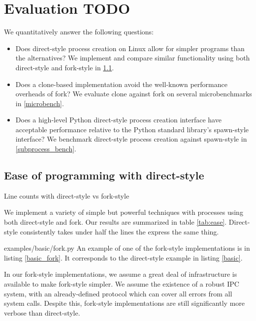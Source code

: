 \documentclass[sigplan]{acmart}
\begin{document}
\section{Evaluation \textbf{TODO}}\label{evaluation}

We quantitatively answer the following questions:
\begin{itemize}
\item
  Does direct-style process creation on Linux allow for simpler programs than the alternatives?
  We implement and compare similar functionality using both direct-style and fork-style in \ref{ease}.
\item
  Does a clone-based implementation avoid the well-known performance overheads of fork?
  We evaluate clone against fork on several microbenchmarks in \ref{microbench}.
\item
  Does a high-level Python direct-style process creation interface
  have acceptable performance relative to the Python standard library's spawn-style interface?
  We benchmark direct-style process creation against spawn-style in \ref{subprocess_bench}.
\end{itemize}
\subsection{Ease of programming with direct-style}\label{ease}
\begin{table}

\caption{Line counts with direct-style vs fork-style}
\label{tab:ease}
\end{table}
We implement a variety of simple but powerful techniques with processes
using both direct-style and fork.
Our results are summarized in table \ref{tab:ease}.
Direct-style consistently takes under half the lines the express the same thing.

{examples/basic/fork.py}
An example of one of the fork-style implementations is in listing \ref{basic_fork}.
It corresponds to the direct-style example in listing \ref{basic}.

In our fork-style implementations,
we assume a great deal of infrastructure is available to make fork-style simpler.
We assume the existence of a robust IPC system,
with an already-defined protocol which can cover all errors from all system calls.
Despite this, fork-style implementations are still significantly more verbose than direct-style.
\end{document}
